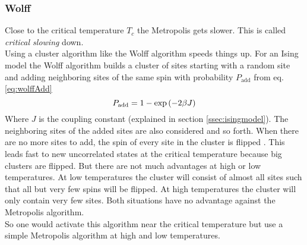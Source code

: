     \subsubsection{Wolff}
    \label{sssec:wolff}
        Close to the critical temperature \(T_c\) the Metropolis
        gets slower. This is called \emph{critical slowing} down.\\
        Using a cluster algorithm like the Wolff
        algorithm \cite{Wolff1989} speeds things up.
        For an Ising model the Wolff algorithm builds a cluster of sites
        starting with a random site and adding neighboring sites of the
        same spin with probability \(P_{\mathrm{add}}\) from eq. \eqref{eq:wolffAdd}
        \begin{equation}
            P_{\mathrm{add}} = 1-\exp\left(-2\beta J\right)
            \label{eq:wolffAdd}
        \end{equation}
        Where \(J\) is the coupling constant (explained in section
        \ref{ssec:isingmodel}). The neighboring sites of the added sites
        are also considered and so forth. When there are no more sites
        to add, the spin of every site in the cluster is flipped
        \cite[p. 91ff]{NewmanBarkema1999} \cite[p. 151f]{Katzgraber2011}.
        This leads fast to new uncorrelated states at the critical
        temperature because big clusters are flipped. But there are not
        much advantages at high or low temperatures. At low temperatures
        the cluster will consist of almost all sites such that all but
        very few spins will be flipped. At high temperatures the cluster
        will only contain very few sites.
        Both situations have no advantage against the Metropolis algorithm.\\
        So one would activate this algorithm near the critical temperature
        but use a simple Metropolis algorithm at high and low temperatures.


